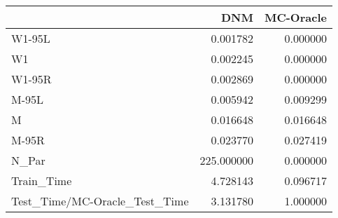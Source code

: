 \begin{tabular}{lrr}
\toprule
{} &         DNM &  MC-Oracle \\
\midrule
W1-95L                        &    0.001782 &   0.000000 \\
W1                            &    0.002245 &   0.000000 \\
W1-95R                        &    0.002869 &   0.000000 \\
M-95L                         &    0.005942 &   0.009299 \\
M                             &    0.016648 &   0.016648 \\
M-95R                         &    0.023770 &   0.027419 \\
N\_Par                         &  225.000000 &   0.000000 \\
Train\_Time                    &    4.728143 &   0.096717 \\
Test\_Time/MC-Oracle\_Test\_Time &    3.131780 &   1.000000 \\
\bottomrule
\end{tabular}
